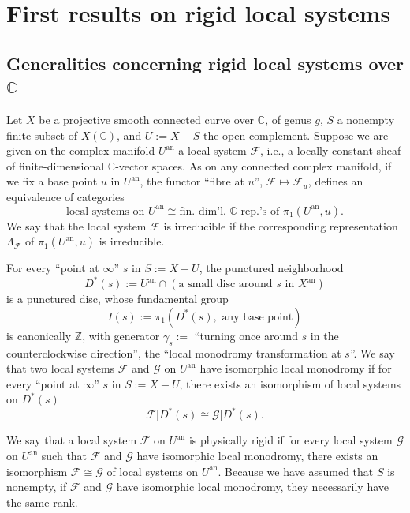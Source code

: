 \chapter{First results on rigid local systems}
\label{chap:1}
\setcounter{section}{-1}

\section{Generalities concerning rigid local systems over \texorpdfstring{\(\mathbb{C}\)}{C}}
\label{sec:1.0}

Let \(X\) be a projective smooth connected curve over \(\mathbb{C}\), of genus
\(g\), \(S\) a nonempty finite subset of \(X(\mathbb{C})\), and
\(U:=X-S\) the open complement. Suppose we are given on the complex manifold
\(U^{\mathrm{an}}\) a local system \(\mathcal{F}\), i.e., a locally constant
sheaf of finite-dimensional \(\mathbb{C}\)-vector spaces. As on any connected
complex manifold, if we fix a base point \(u\) in \(U^{\mathrm{an}}\), the
functor ``fibre at \(u\)'', \(\mathcal{F}\mapsto\mathcal{F}_u\), defines an
equivalence of categories
\[
  \text{local systems on }U^{\mathrm{an}}
  \cong
  \text{fin.-dim'l. }\mathbb{C}\text{-rep.'s of }\pi_1(U^{\mathrm{an}},u).
\]
We say that the local system \(\mathcal{F}\) is irreducible if the
corresponding representation \(\Lambda_{\mathcal{F}}\) of
\(\pi_1(U^{\mathrm{an}},u)\) is irreducible.

For every ``point at \(\infty\)'' \(s\) in \(S:=X-U\), the punctured
neighborhood
\[
  D^*(s):=U^{\mathrm{an}}\cap
  (\text{a small disc around }s\text{ in }X^{\mathrm{an}})
\]
is a punctured disc, whose fundamental group
\[
  I(s):=\pi_1(D^*(s),\text{ any base point})
\]
is canonically \(\mathbb{Z}\), with generator
\(\gamma_s:=\) ``turning once around \(s\) in the counterclockwise direction'',
the ``local monodromy transformation at \(s\)''. We say that two local systems
\(\mathcal{F}\) and \(\mathcal{G}\) on \(U^{\mathrm{an}}\) have isomorphic
local monodromy if for every ``point at \(\infty\)'' \(s\) in \(S:=X-U\),
there exists an isomorphism of local systems on \(D^*(s)\)
\[
  \mathcal{F}\vert D^*(s)\cong \mathcal{G}\vert D^*(s).
\]

We say that a local system \(\mathcal{F}\) on \(U^{\mathrm{an}}\) is
physically rigid if for every local system \(\mathcal{G}\) on
\(U^{\mathrm{an}}\) such that \(\mathcal{F}\) and \(\mathcal{G}\) have
isomorphic local monodromy, there exists an isomorphism
\(\mathcal{F}\cong\mathcal{G}\) of local systems on \(U^{\mathrm{an}}\).
Because we have assumed that \(S\) is nonempty, if \(\mathcal{F}\) and
\(\mathcal{G}\) have isomorphic local monodromy, they necessarily have the same
rank.

